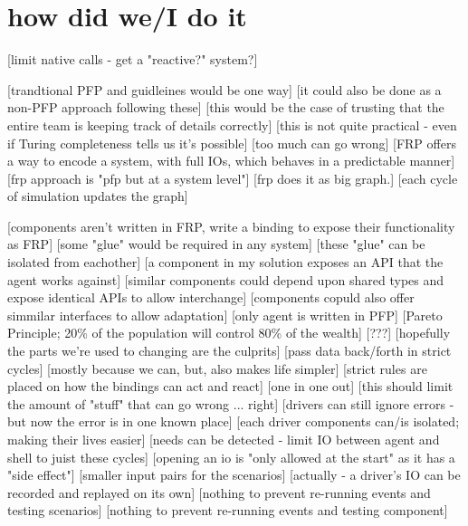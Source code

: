 


\section{how did we/I do it}


[limit native calls - get a "reactive?" system?]




[trandtional PFP and guidleines would be one way]
    [it could also be done as a non-PFP approach following these]
    [this would be the case of trusting that the entire team is keeping track of details correctly]
    [this is not quite practical - even if Turing completeness tells us it's possible]
    [too much can go wrong]
[FRP offers a way to encode a system, with full IOs, which behaves in a predictable manner]
    [frp approach is "pfp but at a system level"]
    [frp does it as big graph.]
    [each cycle of simulation updates the graph]

[components aren't written in FRP, write a binding to expose their functionality as FRP]
    [some "glue" would be required in any system]
    [these "glue" can be isolated from eachother]
        [a component in my solution exposes an API that the agent works against]
        [similar components could depend upon shared types and expose identical APIs to allow interchange]
        [components copuld also offer simmilar interfaces to allow adaptation]
[only agent is written in PFP]
    [Pareto Principle; 20\% of the population will control 80\% of the wealth]
    [???]
	[hopefully the parts we're used to changing are the culprits]
[pass data back/forth in strict cycles]
	[mostly because we can, but, also makes life simpler]
	[strict rules are placed on how the bindings can act and react]
	    [one in one out]
	[this should limit the amount of "stuff" that can go wrong ... right]
	    [drivers can still ignore errors - but now the error is in one known place]
	[each driver components can/is isolated; making their lives easier]
[needs can be detected - limit IO between agent and shell to juist these cycles]
	[opening an io is "only allowed at the start" as it has a "side effect"]
	[smaller input pairs for the scenarios]
	    [actually - a driver's IO can be recorded and replayed on its own]
	[nothing to prevent re-running events and testing scenarios]
	[nothing to prevent re-running events and testing component]



